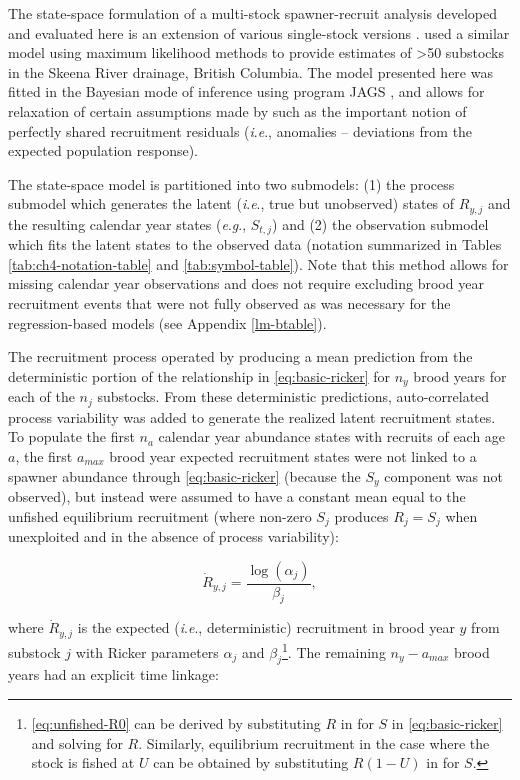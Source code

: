 \documentclass[12pt,]{book}
\let\rmarkdownfootnote\footnote%
\def\footnote{\protect\rmarkdownfootnote}
\theoremstyle{definition}
\theoremstyle{definition}
\theoremstyle{definition}
\theoremstyle{remark}
\begin{document}
The state-space formulation of a multi-stock spawner-recruit analysis
developed and evaluated here is an extension of various single-stock
versions \citep[\emph{e}.\emph{g}.,][]{fleischman-etal-2013}.
\citet{walters-etal-2008} used a similar model using maximum likelihood
methods to provide estimates of \textgreater{}50 substocks in the Skeena
River drainage, British Columbia. The model presented here was fitted in
the Bayesian mode of inference using program JAGS \citep{plummer-2017},
and allows for relaxation of certain assumptions made by
\citet{walters-etal-2008} such as the important notion of perfectly
shared recruitment residuals (\emph{i}.\emph{e}., anomalies --
deviations from the expected population response).

The state-space model is partitioned into two submodels: (1) the process
submodel which generates the latent (\emph{i}.\emph{e}., true but
unobserved) states of \(R_{y,j}\) and the resulting calendar year states
(\emph{e}.\emph{g}., \(S_{t,j}\)) and (2) the observation submodel which
fits the latent states to the observed data (notation summarized in
Tables \ref{tab:ch4-notation-table} and \ref{tab:symbol-table}). Note
that this method allows for missing calendar year observations and does
not require excluding brood year recruitment events that were not fully
observed as was necessary for the regression-based models (see Appendix
\ref{lm-btable}).

The recruitment process operated by producing a mean prediction from the
deterministic portion of the \citet{ricker-1954} relationship in
\eqref{eq:basic-ricker} for \(n_y\) brood years for each of the \(n_j\)
substocks. From these deterministic predictions, auto-correlated process
variability was added to generate the realized latent recruitment
states. To populate the first \(n_a\) calendar year abundance states
with recruits of each age \(a\), the first \(a_{max}\) brood year
expected recruitment states were not linked to a spawner abundance
through \eqref{eq:basic-ricker} (because the \(S_y\) component was not
observed), but instead were assumed to have a constant mean equal to the
unfished equilibrium recruitment (where non-zero \(S_j\) produces
\(R_j = S_j\) when unexploited and in the absence of process
variability):

\begin{equation}
  \dot{R}_{y,j}=\frac{\log(\alpha_j)}{\beta_j},
  \label{eq:unfished-R0}
\end{equation}

\noindent
where \(\dot{R}_{y,j}\) is the expected (\emph{i}.\emph{e}.,
deterministic) recruitment in brood year \(y\) from substock \(j\) with
Ricker parameters \(\alpha_j\) and \(\beta_j\)\footnote{\eqref{eq:unfished-R0}
  can be derived by substituting \(R\) in for \(S\) in
  \eqref{eq:basic-ricker} and solving for \(R\). Similarly, equilibrium
  recruitment in the case where the stock is fished at \(U\) can be
  obtained by substituting \(R(1 - U)\) in for \(S\).}. The remaining
\(n_y - a_{max}\) brood years had an explicit time linkage:
\end{document}
